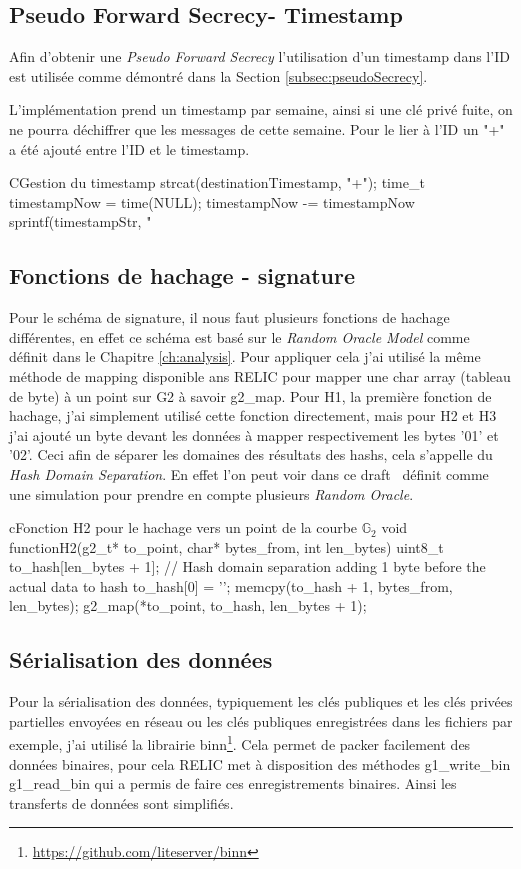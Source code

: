 \subsection{Pseudo Forward Secrecy- Timestamp}
Afin d'obtenir une \textit{Pseudo Forward Secrecy} l'utilisation d'un timestamp dans l'ID est utilisée comme démontré dans la Section \ref{subsec:pseudoSecrecy}.

L'implémentation prend un timestamp par semaine, ainsi si une clé privé fuite, on ne pourra déchiffrer que les messages de cette semaine. Pour le lier à l'ID un "+" a été ajouté entre l'ID et le timestamp.
\begin{sourcebox}{C}{Gestion du timestamp}
	strcat(destinationTimestamp, "+");
	time_t timestampNow = time(NULL);
	timestampNow -= timestampNow %
	sprintf(timestampStr, "%
\end{sourcebox}

\subsection{Fonctions de hachage - signature}
Pour le schéma de signature, il nous faut plusieurs fonctions de hachage différentes, en effet ce schéma est basé sur le \textit{Random Oracle Model} comme définit dans le Chapitre \ref{ch:analysis}. Pour appliquer cela j'ai utilisé la même méthode de mapping disponible ans RELIC pour mapper une char array (tableau de byte) à un point sur G2 à savoir g2\_map.
Pour H1, la première fonction de hachage, j'ai simplement utilisé cette fonction directement, mais pour H2 et H3 j'ai ajouté un byte devant les données à mapper respectivement les bytes '01' et '02'. Ceci afin de séparer les domaines des résultats des hashs, cela s'appelle du \textit{Hash Domain Separation}. En effet l'on peut voir dans ce draft~\cite{irtf-cfrg-hash-to-curve} définit comme une simulation pour prendre en compte plusieurs \textit{Random Oracle}.

\begin{sourcebox}{c}{Fonction H2 pour le hachage vers un point de la courbe $\mathbb{G}_2$}
	void functionH2(g2_t* to_point, char* bytes_from, int len_bytes){
		uint8_t to_hash[len_bytes + 1];
		// Hash domain separation adding 1 byte  before the actual data to hash
		to_hash[0] = '';
		memcpy(to_hash + 1, bytes_from, len_bytes);
		g2_map(*to_point, to_hash, len_bytes + 1);
	}
\end{sourcebox}

\subsection{Sérialisation des données}
Pour la sérialisation des données, typiquement les clés publiques et les clés privées partielles envoyées en réseau ou les clés publiques enregistrées dans les fichiers par exemple, j'ai utilisé la librairie binn\footnote{\url{https://github.com/liteserver/binn}}. Cela permet de packer facilement des données binaires, pour cela RELIC met à disposition des méthodes g1\_write\_bin g1\_read\_bin qui a permis de faire ces enregistrements binaires. Ainsi les transferts de données sont simplifiés.

